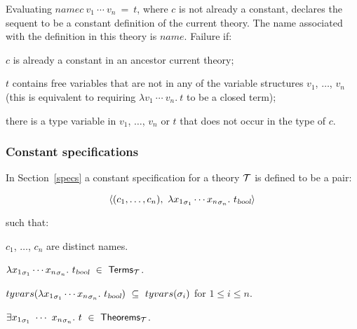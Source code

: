 \noindent Evaluating
 $name$$c\ v_1\ \cdots\ v_n\ =\ t$\ml{)},
where $c$ is not already a constant, declares the sequent
 to be a constant definition
of the current theory. The name associated with the definition in
this theory is $name$.
Failure if:
\begin{myenumerate}
\item $c$ is already a constant in an ancestor current theory;
\item $t$ contains free variables that are not in any of
the variable structures $v_1$, $\dots$, $v_n$ (this is equivalent
to requiring $\lambda v_1\ \cdots\ v_n.\  t$ to be a closed term);
\item there is a type variable in  $v_1$, $\dots$, $v_n$ or $t$
that does not occur in the type of $c$.
\end{myenumerate}

\subsubsection{Constant specifications}
\label{conspec}

In Section~\ref{specs} a constant specification for a theory ${\cal T}$
is defined to be a pair:

\[ \langle(c_1,\ldots,c_n),\ \lquant{{x_1}_{\sigma_1}
\cdots {x_n}_{\sigma_n}}t_{\ty{bool}}\rangle \]

\noindent such that:

\begin{myenumerate}
\item $c_1$, $\dots$, $c_n$ are distinct names.
\item $\lambda {x_1}_{\sigma_1}
\cdots {x_n}_{\sigma_n}.\ t_{\textsl{bool}}\ \in\ {\sf Terms}_{\cal T}$.
\item $tyvars(\lquant{{x_1}_{\sigma_1}
\cdots {x_n}_{\sigma_n}}t_{\ty{bool}})\ \subseteq\ tyvars(\sigma_i)$ for
$1\leq i\leq n$.
\item $\equant{{x_1}_{\sigma_1}\ \cdots\ {x_n}_{\sigma_n}}t
\ \in\ {\sf Theorems}_{\cal T}$.
\end{myenumerate}

